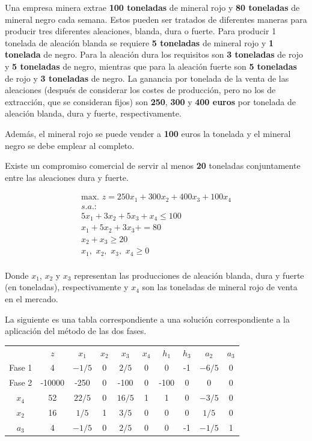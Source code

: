 Una empresa minera extrae \textbf{100 toneladas} de mineral rojo y \textbf{80 toneladas} de mineral negro cada semana. Estos pueden ser tratados de diferentes maneras para producir tres diferentes aleaciones, blanda, dura o fuerte. Para producir 1 tonelada de aleación blanda se requiere \textbf{5 toneladas} de mineral rojo y \textbf{1 tonelada} de negro. Para la aleación dura los requisitos son \textbf{3 toneladas} de rojo y \textbf{5 toneladas} de negro, mientras que para la aleación fuerte son \textbf{5 toneladas} de rojo y \textbf{3 toneladas} de negro. La ganancia por tonelada de la venta de las aleaciones (después de considerar los costes de producción, pero no los de extracción, que se consideran fijos) son \textbf{250}, \textbf{300} y \textbf{400 euros} por tonelada de aleación blanda, dura y fuerte, respectivamente.

Además, el mineral rojo se puede vender a \textbf{100} euros la tonelada y el mineral negro se debe emplear al completo.

Existe un compromiso comercial de servir al menos \textbf{20} toneladas conjuntamente entre las aleaciones dura y fuerte.

\begin{equation}
\begin{split}
\mbox{max. } z = 250x_1 + 300x_2 + 400x_3 + 100x_4\\
s.a.:\\
5x_1 + 3x_2 + 5x_3 + x_4 \leq 100\\
 x_1 + 5x_2 + 3x_3 +  = 80\\
        x_2 +  x_3  \geq 20\\
x_1,\,\,x_2,\,\,x_3,\,\,x_4\geq 0\\
\end{split}
\end{equation}

Donde $x_1$, $x_2$ y $x_3$ representan las producciones de aleación blanda, dura y fuerte (en toneladas), respectivamente y $x_4$ son las toneladas de mineral rojo de venta en el mercado.

La siguiente es una tabla correspondiente a una solución correspondiente a la aplicación del método de las dos fases.

\begin{center}
\begin{tabular}{c|c|cccccccc|}
 & $z$ & $x_1$ & $x_2$ & $x_3$ & $x_4$ & $h_1$ & $h_3$ & $a_2$ & $a_3$\\ 
Fase 1 & 4 & $-1/5$ & 0 & $2/5$ & 0 & 0 & -1 & $-6/5$ & 0 \\ 
Fase 2 & -10000 & -250 & 0 & -100 & 0 & -100 & 0 & 0 & 0 \\ 
\hline
$x_4$ & 52  & $22/5$ & 0 & $16/5$ & 1 & 1 & 0 & $-3/5$ & 0\\ 
$x_2$ & 16  & $1/5$ & 1 & $3/5$ & 0 & 0 & 0 & $1/5$ & 0\\ 
$a_3$ & 4  & $-1/5$ & 0 & $2/5$ & 0 & 0 & -1 & $-1/5$ & 1\\ 
\hline
\end{tabular}
\end{center}


